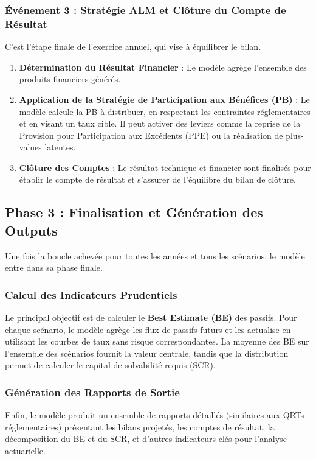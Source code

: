 \subsubsection{Événement 3 : Stratégie ALM et Clôture du Compte de Résultat}
C'est l'étape finale de l'exercice annuel, qui vise à équilibrer le bilan.
\begin{enumerate}
\item \textbf{Détermination du Résultat Financier} : Le modèle agrège l'ensemble des produits financiers générés.
\item \textbf{Application de la Stratégie de Participation aux Bénéfices (PB)} : Le modèle calcule la PB à distribuer, en respectant les contraintes réglementaires et en visant un taux cible. Il peut activer des leviers comme la reprise de la Provision pour Participation aux Excédents (PPE) ou la réalisation de plus-values latentes.
\item \textbf{Clôture des Comptes} : Le résultat technique et financier sont finalisés pour établir le compte de résultat et s'assurer de l'équilibre du bilan de clôture.
\end{enumerate}

\subsection{Phase 3 : Finalisation et Génération des Outputs}

Une fois la boucle achevée pour toutes les années et tous les scénarios, le modèle entre dans sa phase finale.

\subsubsection{Calcul des Indicateurs Prudentiels}
Le principal objectif est de calculer le \textbf{Best Estimate (BE)} des passifs. Pour chaque scénario, le modèle agrège les flux de passifs futurs et les actualise en utilisant les courbes de taux sans risque correspondantes. La moyenne des BE sur l'ensemble des scénarios fournit la valeur centrale, tandis que la distribution permet de calculer le capital de solvabilité requis (SCR).

\subsubsection{Génération des Rapports de Sortie}
Enfin, le modèle produit un ensemble de rapports détaillés (similaires aux QRTs réglementaires) présentant les bilans projetés, les comptes de résultat, la décomposition du BE et du SCR, et d'autres indicateurs clés pour l'analyse actuarielle.

